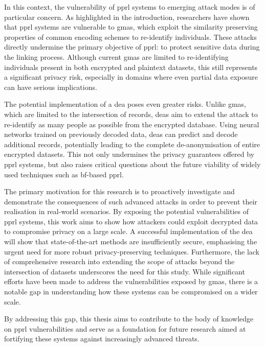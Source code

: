 In this context, the vulnerability of \ac{pprl} systems to emerging attack modes is of particular concern. 
As highlighted in the introduction, researchers have shown that \ac{pprl} systems are vulnerable to \ac{gma}s, which exploit the similarity preserving properties of common encoding schemes to re-identify individuals. 
These attacks directly undermine the primary objective of \ac{pprl}: to protect sensitive data during the linking process. 
Although current \ac{gma}s are limited to re-identifying individuals present in both encrypted and plaintext datasets, this still represents a significant privacy risk, especially in domains where even partial data exposure can have serious implications.

The potential implementation of a \ac{dea} poses even greater risks. 
Unlike \ac{gma}s, which are limited to the intersection of records, \ac{dea}s aim to extend the attack to re-identify as many people as possible from the encrypted database. 
Using neural networks trained on previously decoded data, \ac{dea}s can predict and decode additional records, potentially leading to the complete de-anonymisation of entire encrypted datasets. 
This not only undermines the privacy guarantees offered by \ac{pprl} systems, but also raises critical questions about the future viability of widely used techniques such as \ac{bf}-based \ac{pprl}.

The primary motivation for this research is to proactively investigate and demonstrate the consequences of such advanced attacks in order to prevent their realisation in real-world scenarios.
By exposing the potential vulnerabilities of \ac{pprl} systems, this work aims to show how attackers could exploit decrypted data to compromise privacy on a large scale. 
A successful implementation of the \ac{dea} will show that state-of-the-art methods are insufficiently secure, emphasising the urgent need for more robust privacy-preserving techniques.
Furthermore, the lack of comprehensive research into extending the scope of attacks beyond the intersection of datasets underscores the need for this study. 
While significant efforts have been made to address the vulnerabilities exposed by \ac{gma}s, there is a notable gap in understanding how these systems can be compromised on a wider scale.

By addressing this gap, this thesis aims to contribute to the body of knowledge on \ac{pprl} vulnerabilities and serve as a foundation for future research aimed at fortifying these systems against increasingly advanced threats.



